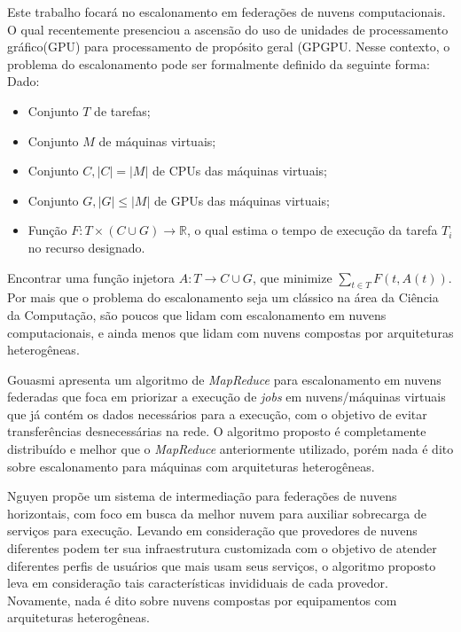 Este trabalho focará no escalonamento em federações de nuvens computacionais. O qual recentemente presenciou a ascensão do uso de unidades de processamento gráfico(\acrfull{GPU}) para processamento de propósito geral (\acrfull{GPGPU}\cite{Dimitrov:2009:USA:1513895.1513907}\cite{Yang:2010:GCM:1809028.1806606}. Nesse contexto, o problema do escalonamento pode ser formalmente definido da seguinte forma:\\
Dado:
\begin{itemize}
	\item Conjunto $T$ de tarefas;
	\item Conjunto $M$ de máquinas virtuais;
	\item Conjunto $C, |C| = |M|$ de CPUs das máquinas virtuais;
	\item Conjunto $G,  |G| \le |M|$ de GPUs das máquinas virtuais;
	\item Função $F: T \times (C \cup G) \to \mathbb{R}$, o qual estima o tempo de execução da tarefa $T_{i}$ no recurso designado.
\end{itemize}
Encontrar uma função injetora $A: T \to C \cup G$, que minimize $\sum_{t \in T} F(t, A(t) )$.\\

Por mais que o problema do escalonamento seja um clássico na área da Ciência da Computação, são poucos que lidam com escalonamento em nuvens computacionais, e ainda menos que lidam com nuvens compostas por arquiteturas heterogêneas. 

Gouasmi\cite{MapReduce_sched_8034997} apresenta um algoritmo de \textit{MapReduce}\cite{Dean:2008:MSD:1327452.1327492} para escalonamento em nuvens federadas que foca em priorizar a execução de \textit{jobs} em nuvens/máquinas virtuais que já contém os dados necessários para a execução, com o objetivo de evitar transferências desnecessárias na rede. O algoritmo proposto é completamente distribuído e melhor que o \textit{MapReduce} anteriormente utilizado, porém nada é dito sobre escalonamento para máquinas com arquiteturas heterogêneas.

Nguyen\cite{7791859} propõe um sistema de intermediação para federações de nuvens horizontais, com foco em busca da melhor nuvem para auxiliar sobrecarga de serviços para execução. Levando em consideração que provedores de nuvens diferentes podem ter sua infraestrutura customizada com o objetivo de atender diferentes perfis de usuários que mais usam seus serviços, o algoritmo proposto leva em consideração tais características invididuais de cada provedor. Novamente, nada é dito sobre nuvens compostas por equipamentos com arquiteturas heterogêneas.

